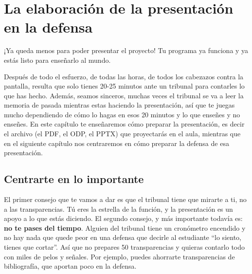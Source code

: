 \chapter{La elaboración de la presentación en la defensa} \label{cap:elaboraciónPresentación}


¡Ya queda menos para poder presentar el proyecto! Tu programa ya funciona y ya estás listo para enseñarlo al mundo.

Después de todo el esfuerzo, de todas las horas, de todos los cabezazos contra la pantalla, resulta que solo tienes 20-25 minutos ante un tribunal para contarles lo que has hecho. Además, seamos sinceros, muchas veces el tribunal se va a leer la memoria de pasada mientras estas haciendo la presentación, así que te juegas mucho dependiendo de cómo lo hagas en esos 20 minutos y lo que enseñes y no enseñes. En este capítulo te enseñaremos cómo preparar la presentación, es decir el archivo (el PDF, el ODP, el PPTX) que proyectarás en el aula, mientras que en el siguiente capítulo nos centraremos en cómo preparar la defensa de esa presentación.

\section{Centrarte en lo importante}

El primer consejo que te vamos a dar es que el tribunal tiene que mirarte a ti, no a las transparencias. Tú eres la estrella de la función, y la presentación es un apoyo a lo que estás diciendo. El segundo consejo, y más importante todavía es: \textbf{no te pases del tiempo}. Alguien del tribunal tiene un cronómetro encendido y no hay nada que quede peor en una defensa que decirle al estudiante ``lo siento, tienes que cortar''. Así que no prepares 50 transparencias y quieras contarlo todo con miles de pelos y señales. Por ejemplo, puedes ahorrarte transparencias de bibliografía, que aportan poco en la defensa.

